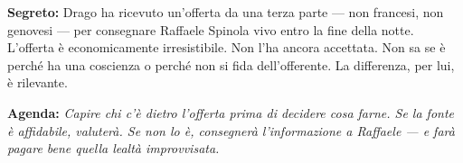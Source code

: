 \clearpage

\begin{secretbox}
  \textbf{Segreto:} Drago ha ricevuto un'offerta da una terza parte — non
  francesi, non genovesi — per consegnare Raffaele Spinola vivo entro la
  fine della notte. L'offerta è economicamente irresistibile. Non l'ha ancora
  accettata. Non sa se è perché ha una coscienza o perché non si fida
  dell'offerente. La differenza, per lui, è rilevante.

  \medskip\noindent\textcolor{SecretRed}{\textbf{Agenda:}}
  \textit{Capire chi c'è dietro l'offerta prima di decidere cosa farne.
  Se la fonte è affidabile, valuterà. Se non lo è, consegnerà l'informazione
  a Raffaele — e farà pagare bene quella lealtà improvvisata.}
\end{secretbox}
